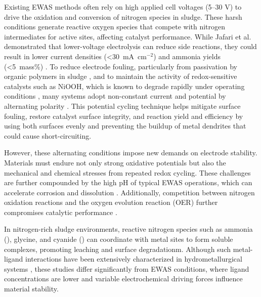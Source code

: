 \documentclass[journal=jacsat,manuscript=article]{achemso}
\begin{document}
Existing EWAS methods often rely on high applied cell voltages (5–30 V) to drive the oxidation and conversion of nitrogen species in sludge. These harsh conditions generate reactive oxygen species that compete with nitrogen intermediates for active sites, affecting catalyst performance. While Jafari et al. \cite{JafariElectrochemicalProduction} demonstrated that lower-voltage electrolysis can reduce side reactions, they could result in lower current densities (<30~mA~cm$^{-2}$) and ammonia yields (<5~mass\%) \cite{Zhao2022AAmmonia}. To reduce electrode fouling, particularly from passivation by organic polymers in sludge \cite{Wang2014InCatalysts}, and to maintain the activity of redox-sensitive catalysts such as NiOOH, which is known to degrade rapidly under operating conditions \cite{JafariElectrochemicalProduction}, many systems adopt non-constant current and potential by alternating polarity \cite{Schotten2021AlternatingSynthesis, Hall2020SustainablePrinciples, Chandrasekar2008PulseApplications, Larson2012CurrentReview, Adamson2017ProbingVoltammetry}. This potential cycling technique helps mitigate surface fouling, restore catalyst surface integrity, and reaction yield and efficiency by using both surfaces evenly and preventing the buildup of metal dendrites that could cause short-circuiting. 

However, these alternating conditions impose new demands on electrode stability. Materials must endure not only strong oxidative potentials but also the mechanical and chemical stresses from repeated redox cycling. These challenges are further compounded by the high pH of typical EWAS operations, which can accelerate corrosion and dissolution \cite{Sanchis2022NitrateOverview, Popov2015ThermodynamicsCorrosion, Kapaka2010ElectrochemicalElectrode, Mucalo2004InSolutions, Aksu2001ElectrochemistrySolutions, OConnor2018ElectrochemicalSolutions}. Additionally, competition between nitrogen oxidation reactions and the oxygen evolution reaction (OER) further compromises catalytic performance \cite{Li2021Ru-DopedNitrate, Wang2022ElectrochemicalOxidation, Dai2020ElectrochemicalOxides}.

In nitrogen-rich sludge environments, reactive nitrogen species such as ammonia (), glycine, and cyanide () can coordinate with metal sites to form soluble complexes, promoting leaching and surface degradationm\cite{Bjerrum1957StabilitySubstances, Meng1996PrinciplesReview, Wang2022AmmoniaSystem}. Although such metal-ligand interactions have been extensively characterized in hydrometallurgical systems \cite{Han1974AMMONIA-AMMONIUMNODULES, Bhuntumkomol1982TheSolutions, Azadi2021SustainableGlycine, Oraby2020GoldPermanganate, Sarvar2023ApplicationStructure, SPARROW1995CyanideApplications, Akcil2015PreciousReview}, these studies differ significantly from EWAS conditions, where ligand concentrations are lower and variable electrochemical driving forces influence material stability.
\end{document}
